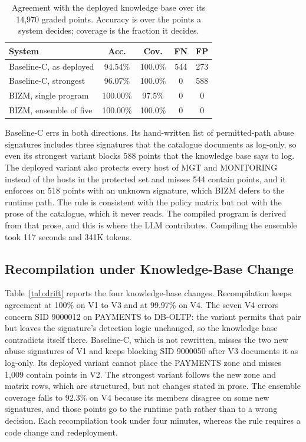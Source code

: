 \documentclass[final,5p]{elsarticle}
\begin{document}
\begin{table}[t]
    \centering
    \caption{Agreement with the deployed knowledge base over its 14,970 graded points. Accuracy is over the points a system decides; coverage is the fraction it decides.}
    \label{tab:compiled}
    \small
    \setlength{\tabcolsep}{4pt}
    \begin{tabular}{@{}lcccc@{}}
        \toprule
        \textbf{System} & \textbf{Acc.} & \textbf{Cov.} & \textbf{FN} & \textbf{FP} \\
        \midrule
        Baseline-C, as deployed  & 94.54\%  & 100.0\% & 544 & 273 \\
        Baseline-C, strongest    & 96.07\%  & 100.0\% & 0   & 588 \\
        BIZM, single program     & 100.00\% & 97.5\%  & 0   & 0   \\
        BIZM, ensemble of five   & 100.00\% & 100.0\% & 0   & 0   \\
        \bottomrule
    \end{tabular}
\end{table}

Baseline-C errs in both directions. Its hand-written list of permitted-path abuse signatures includes three signatures that the catalogue documents as log-only, so even its strongest variant blocks 588 points that the knowledge base says to log. The deployed variant also protects every host of MGT and MONITORING instead of the hosts in the protected set and misses 544 contain points, and it enforces on 518 points with an unknown signature, which BIZM defers to the runtime path. The rule is consistent with the policy matrix but not with the prose of the catalogue, which it never reads. The compiled program is derived from that prose, and this is where the LLM contributes. Compiling the ensemble took 117 seconds and 341K tokens.

\subsection{Recompilation under Knowledge-Base Change}
\label{sec:drift}

Table~\ref{tab:drift} reports the four knowledge-base changes. Recompilation keeps agreement at 100\% on V1 to V3 and at 99.97\% on V4. The seven V4 errors concern SID 9000012 on PAYMENTS to DB-OLTP: the variant permits that pair but leaves the signature's detection logic unchanged, so the knowledge base contradicts itself there. Baseline-C, which is not rewritten, misses the two new abuse signatures of V1 and keeps blocking SID 9000050 after V3 documents it as log-only. Its deployed variant cannot place the PAYMENTS zone and misses 1,009 contain points in V2. The strongest variant follows the new zone and matrix rows, which are structured, but not changes stated in prose. The ensemble coverage falls to 92.3\% on V4 because its members disagree on some new signatures, and those points go to the runtime path rather than to a wrong decision. Each recompilation took under four minutes, whereas the rule requires a code change and redeployment.
\end{document}
